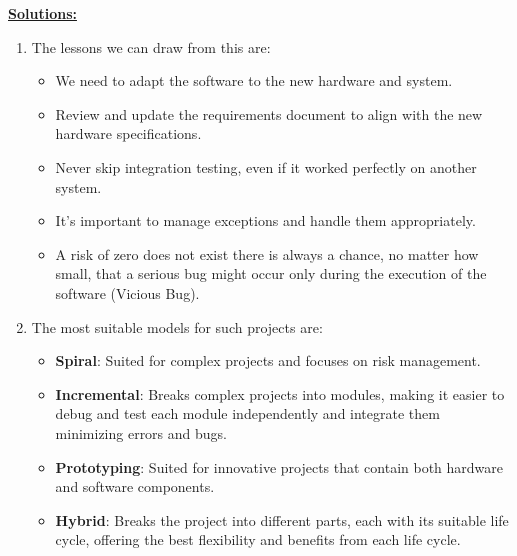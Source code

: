\vspace{1.5cm}

\textbf{\underline{\large{Solutions:}}}\\
\begin{enumerate}
    \item The lessons we can draw from this are:
        \begin{itemize}
            \item We need to adapt the software to the new hardware and system.
            \vspace{0.15cm}
            \item Review and update the requirements document to align with the new hardware specifications.
            \vspace{0.15cm}
            \item Never skip integration testing, even if it worked perfectly on another system.
            \vspace{0.15cm}
            \item It's important to manage exceptions and handle them appropriately. 
            \vspace{0.15cm}
            \item A risk of zero does not exist there is always a chance, no matter how small, that a serious
bug might occur only during the execution of the software (Vicious Bug).
        \end{itemize}
\vspace{1cm}
    \item The most suitable models for such projects are:
        \begin{itemize}
            \item \textbf{Spiral}: Suited for complex projects and focuses on risk management.
           
\vspace{0.15cm}
            \item \textbf{Incremental}: Breaks complex projects into modules, making it easier to debug and test each module
independently and integrate them minimizing errors and bugs.

\vspace{0.15cm}
            \item \textbf{Prototyping}: Suited for innovative projects that contain both hardware and software components.

\vspace{0.15cm}
           \item \textbf{Hybrid}: Breaks the project into different parts, each with its suitable life cycle, offering the best
flexibility and benefits from each life cycle.
        \end{itemize}
\end{enumerate}

\vspace{0.75cm}

